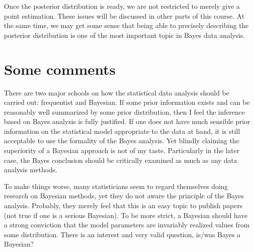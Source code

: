 Once the posterior distribution is ready,
we are not restricted to merely give a point estimation.
These issues will be discussed in other parts of this
course. At the same time, we may get some sense that
being able to precisely describing the posterior distribution
is one of the most important topic in Bayes data analysis.

\section{Some comments}

There are two major schools on how the statistical data analysis
should be carried out: frequentist and Bayesian. If some prior information
exists and can be reasonably well summarized by some prior distribution,
then I feel the inference based on Bayes analysis is fully justified. If one does not
have much sensible prior information on the statistical model appropriate
to the data at hand, it is still acceptable to use the formality of the
Bayes analysis. Yet blindly claiming the superiority of a Bayesian approach
is not of my taste. Particularly in the later case, the Bayes conclusion
should be critically examined as much as any data analysis methods.

To make things worse, many statisticians seem to regard themselves
doing research on Bayesian methods, yet they do not aware
the principle of the Bayes analysis. Probably, they merely feel that this is an easy
topic to publish papers (not true if one is a serious Bayesian).
To be more strict, a Bayesian should have a strong conviction that
the model parameters are invariably realized values from some distribution.
There is an interest and very valid question, is/was Bayes a Bayesian?
